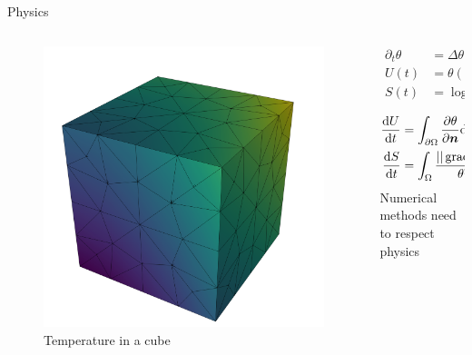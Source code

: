 \documentclass[aspectratio=169]{beamer}
\renewcommand\d{\ensuremath{\mathrm{d}}}
\DeclareMathOperator*{\grad}{grad}
\begin{document}
\begin{frame}{Physics}
	
	\begin{columns}
		\begin{column}{.5\textwidth}
			\begin{figure}
			\includegraphics[width=.95\columnwidth]{cube_sol.pdf}
			\caption*{Temperature in a cube}
			\end{figure}
			\end{column}
		
		\begin{column}{.5\textwidth}
			\begin{equation*}
				\begin{aligned}
				\partial_t \theta &= \Delta \theta, \\
				U(t) &= \theta(t), \qquad \qquad \text{Energy}, \\
				S(t) &= \log \theta(t), \qquad\; \text{Entropy}. \\
				\end{aligned}
			\end{equation*}
		\vspace{1cm}
		\begin{equation*}
			\begin{aligned}
				\diff{U}{t} &=\int_{\partial \Omega} \diffp{\theta}{\bm{n}} \d\Sigma, \\
				\diff{{S}}{t} &= \int_{\Omega} \frac{||\grad \theta||^2}{\theta^2} \d\Omega + \int_{\partial\Omega}\frac{1}{\theta} \diffp{\theta}{\bm{n}} \d\Sigma. \\
			\end{aligned}
		\end{equation*}
		Numerical methods need to respect physics
		\end{column}
	\end{columns}
	
	
	\end{frame}
\end{document}
